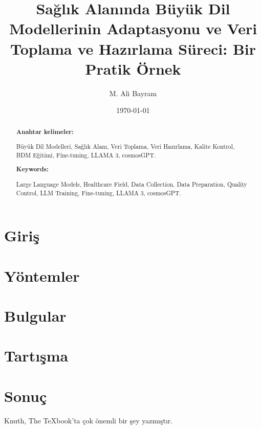 \documentclass[9pt,a4paper]{article}
\newenvironment{anahtarkelimeler}{
    \small
    \textbf{Anahtar kelimeler:}
}{}
\newenvironment{keywords}{
    \small
    \textbf{Keywords:}
}{}
\newenvironment{poliabstract}[1]
  {\renewcommand{\abstractname}{#1}\begin{abstract}}
  {\end{abstract}}
\begin{document}
\sloppy
\title{Sağlık Alanında Büyük Dil Modellerinin Adaptasyonu ve Veri Toplama ve Hazırlama Süreci: Bir Pratik Örnek}
\author{M. Ali Bayram}
\date{\today}
\maketitle


\begin{poliabstract}{Özet}
  

  \begin{anahtarkelimeler}
    \sloppy
    Büyük Dil Modelleri, Sağlık Alanı, Veri Toplama, Veri Hazırlama, Kalite Kontrol, BDM Eğitimi, Fine-tuning, LLAMA 3, cosmosGPT.
  \end{anahtarkelimeler}
\end{poliabstract}


\newpage

\begin{poliabstract}{Abstract} 
  

  \begin{keywords}
    \sloppypar
    Large Language Models, Healthcare Field, Data Collection, Data Preparation, Quality Control, LLM Training, Fine-tuning, LLAMA 3, cosmosGPT.
  \end{keywords}  
\end{poliabstract}




\twocolumn
\section{Giriş}


\section{Yöntemler}


\section{Bulgular}


\section{Tartışma}


\onecolumn
\section{Sonuç}



Knuth, The TeXbook'ta \cite{knuth84} çok önemli bir şey yazmıştır.



\end{document}
